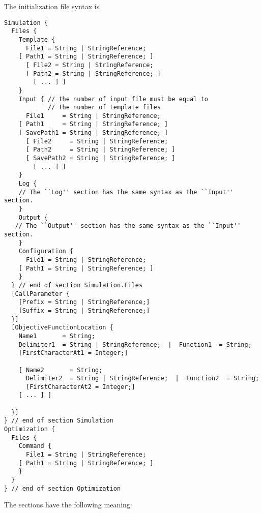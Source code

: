 \noindent The initialization file syntax is
\begin{lstlisting}
Simulation {
  Files {
    Template {
      File1 = String | StringReference;
    [ Path1 = String | StringReference; ]
      [ File2 = String | StringReference;
      [ Path2 = String | StringReference; ]
        [ ... ] ]
    }
    Input { // the number of input file must be equal to
            // the number of template files
      File1     = String | StringReference;
    [ Path1     = String | StringReference; ]
    [ SavePath1 = String | StringReference; ]
      [ File2     = String | StringReference;
      [ Path2     = String | StringReference; ]
      [ SavePath2 = String | StringReference; ]
        [ ... ] ]
    }
    Log {
    // The ``Log'' section has the same syntax as the ``Input'' section.
    }
    Output {
   // The ``Output'' section has the same syntax as the ``Input'' section.
    }
    Configuration {
      File1 = String | StringReference;
    [ Path1 = String | StringReference; ]
    }
  } // end of section Simulation.Files
  [CallParameter {
    [Prefix = String | StringReference;]
    [Suffix = String | StringReference;]
  }]
  [ObjectiveFunctionLocation {
    Name1       = String;
    Delimiter1  = String | StringReference;  |  Function1  = String;
    [FirstCharacterAt1 = Integer;]

    [ Name2       = String;
      Delimiter2  = String | StringReference;  |  Function2  = String;
      [FirstCharacterAt2 = Integer;]
    [ ... ] ]

  }]
} // end of section Simulation
Optimization {
  Files {
    Command {
      File1 = String | StringReference;
    [ Path1 = String | StringReference; ]
    }
  }
} // end of section Optimization
\end{lstlisting}
\pagebreak
\noindent The sections have the following meaning:
